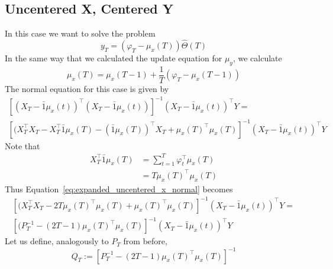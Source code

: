 \subsection{Uncentered X, Centered Y}
In this case we want to solve the problem
\begin{equation}
  y_T = (\varphi_T - \mu_x(T))\hat\Theta(T)
\end{equation}
In the same way that we calculated the update equation for $\mu_y$, we calculate 
\begin{equation}
  \mu_x(T) = \mu_x(T - 1) + \frac{1}{T}(\varphi_T - \mu_x(T - 1))
\end{equation}
The normal equation for this case is given by
\begin{multline}
  \label{eq:expanded_uncentered_x_normal}
  \left[(X_T - \bar{1}\mu_x(t))^\top(X_T - \bar{1}\mu_x(t))\right]^{-1}(X_T - \bar{1}\mu_x(t))^\top Y = \\ \left[(X_T^\top X_T - X_T^\top \bar{1}\mu_x(T) - (\bar{1}\mu_x(T))^\top X_T + \mu_x(T)^\top\mu_x(T)\right]^{-1}(X_T - \bar{1}\mu_x(t))^\top Y
\end{multline}
Note that
\begin{align}
  X_T^\top \bar{1}\mu_x(T) &= \sum_{t=1}^T \varphi_t^\top \mu_x(T) \\
                           &= T \mu_x(T)^\top \mu_x(T)
\end{align}
Thus Equation~\ref{eq:expanded_uncentered_x_normal} becomes
\begin{multline}
  \left[(X_T^\top X_T - 2T\mu_x(T)^\top\mu_x(T) + \mu_x(T)^\top\mu_x(T)\right]^{-1}(X_T - \bar{1}\mu_x(t))^\top Y = \\ \left[(P_T^{-1} - (2T - 1)\mu_x(T)^\top\mu_x(T)\right]^{-1}(X_T - \bar{1}\mu_x(t))^\top Y
\end{multline}
Let us define, analogously to $P_T$ from before, 
\begin{equation}
  Q_T := \left[P_T^{-1} - (2T - 1)\mu_x(T)^\top\mu_x(T)\right]^{-1}
\end{equation}

